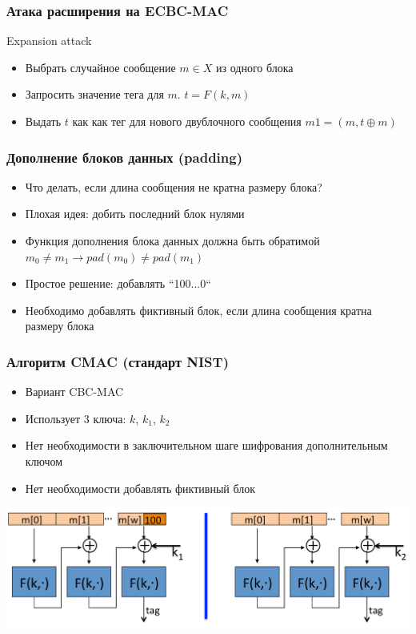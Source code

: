 \documentclass{beamer}
\begin{document}
\begin{frame}
  \frametitle{Атака расширения на ECBC-MAC}

  \begin{block}{Expansion attack}
    \begin{itemize}
      \item{Выбрать случайное сообщение $m \in X$ из одного блока}
      \item{Запросить значение тега для $m$. $t=F(k,m)$}
      \item{Выдать $t$ как как тег для нового двублочного сообщения $m1 = (m, t \oplus m)$}
    \end{itemize}
  \end{block}
\end{frame}

\begin{frame}
  \frametitle{Дополнение блоков данных (padding)}

  \begin{itemize}
    \item{Что делать, если длина сообщения не кратна размеру блока?}
    \item{Плохая идея: добить последний блок нулями}
    \item{Функция дополнения блока данных должна быть обратимой $m_0 \neq m_1 \rightarrow pad(m_0) \neq pad(m_1)$}
    \item{Простое решение: добавлять ``100...0``}
    \item{Необходимо добавлять фиктивный блок, если длина сообщения кратна размеру блока}
  \end{itemize}
\end{frame}

\begin{frame}
  \frametitle{Алгоритм CMAC (стандарт NIST)}

  \begin{itemize}
    \item{Вариант CBC-MAC}
    \item{Использует 3 ключа: $k$, $k_1$, $k_2$}
    \item{Нет необходимости в заключительном шаге шифрования дополнительным ключом}
    \item{Нет необходимости добавлять фиктивный блок}
  \end{itemize}

  \includegraphics[width=\linewidth]{./images/png/CMAC.png}

\end{frame}
\end{document}
